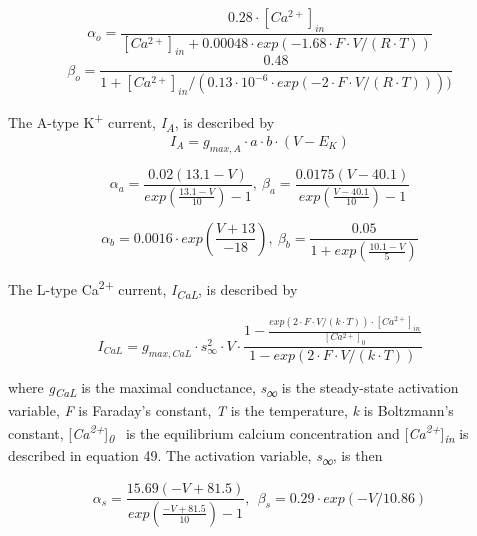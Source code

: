 \documentclass[12pt]{article}
\begin{document}
\begin{equation}
\alpha_{o} = \frac{0.28 \cdot[Ca^{2+}]_{in}}{[Ca^{2+}]_{in} + 0.00048	\cdot exp(-1.68 \cdot F \cdot V / (R \cdot T)) }
\end{equation}
\begin{equation}
\beta_{o} = \frac{0.48}{1 + [Ca^{2+}]_{in} / (0.13 \cdot 10^{-6} \cdot exp(-2 \cdot F \cdot V/ (R \cdot T))) )}
\end{equation}

The A-type K\textsuperscript{+} current,
\textit{I}\textit{\textsubscript{A}}, is described by\ \ 
\begin{equation}
I_A=g_{max, A} \cdot a \cdot b  \cdot (V-E_K)
\end{equation}

\begin{equation}
\alpha_a=\frac{0.02(13.1-V)}{exp(\frac{13.1-V}{10})-1}, \ 
\beta_a=\frac{0.0175(V-40.1)}{exp(\frac{V-40.1}{10})-1}
\end{equation}

\begin{equation}
\alpha_b = 0.0016 \cdot exp(\frac{V + 13}{-18}), \  \beta_b=\frac{0.05}{1+exp(\frac{10.1-V}{5})}
\end{equation}

The L-type Ca\textsuperscript{2+} current, \textit{I\textsubscript{CaL}}, is described by


\begin{equation}
I_{CaL}=g_{max, CaL}\cdot s_{\infty }^2\cdot V \cdot
\frac{1-\frac{exp(2 \cdot F \cdot V/ (k \cdot T)) \cdot [Ca^{2+}]_{in}}{[Ca^{2+}]_{0}}} {1-exp(2 \cdot F \cdot V/(k \cdot T))} 
\end{equation}


where \textit{g}\textit{\textsubscript{CaL}} is the maximal conductance, \textit{s}\textsf{\textit{\textsubscript{∞}}}
is the steady-state activation variable, \textit{F} is Faraday’s constant, \textit{T} is the temperature, \textit{k} is
Boltzmann’s constant, [\textit{Ca\textsuperscript{2+}}]\textit{\textsubscript{0}} \ is the equilibrium calcium concentration and [\textit{Ca\textsuperscript{2+}}]\textit{\textsubscript{in}} is
described in equation 49. The activation variable, \textit{s\textsubscript{∞}}, is then


\begin{equation}
\alpha_s=\frac{15.69(-V+81.5)}{exp(\frac{-V+81.5}{10})-1} , \ \  
\beta_s=0.29\cdot exp(-V/10.86)
\end{equation}
\end{document}

